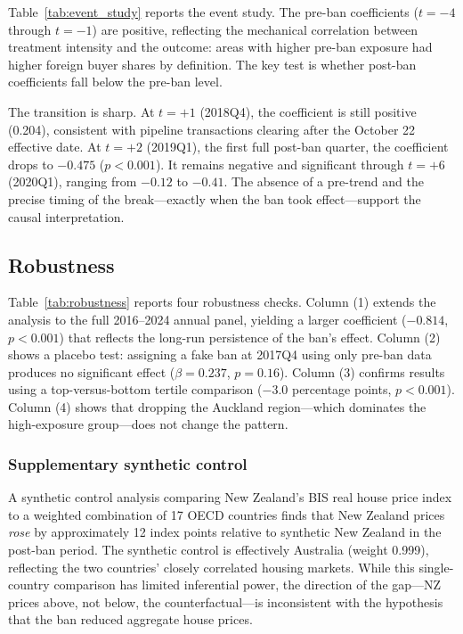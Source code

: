 \documentclass[12pt]{article}
\begin{document}
Table~\ref{tab:event_study} reports the event study. The pre-ban coefficients ($t = -4$ through $t = -1$) are positive, reflecting the mechanical correlation between treatment intensity and the outcome: areas with higher pre-ban exposure had higher foreign buyer shares by definition. The key test is whether post-ban coefficients fall below the pre-ban level.

The transition is sharp. At $t = +1$ (2018Q4), the coefficient is still positive (0.204), consistent with pipeline transactions clearing after the October 22 effective date. At $t = +2$ (2019Q1), the first full post-ban quarter, the coefficient drops to $-0.475$ ($p < 0.001$). It remains negative and significant through $t = +6$ (2020Q1), ranging from $-0.12$ to $-0.41$. The absence of a pre-trend and the precise timing of the break---exactly when the ban took effect---support the causal interpretation.

\subsection{Robustness}



Table~\ref{tab:robustness} reports four robustness checks. Column (1) extends the analysis to the full 2016--2024 annual panel, yielding a larger coefficient ($-0.814$, $p < 0.001$) that reflects the long-run persistence of the ban's effect. Column (2) shows a placebo test: assigning a fake ban at 2017Q4 using only pre-ban data produces no significant effect ($\beta = 0.237$, $p = 0.16$). Column (3) confirms results using a top-versus-bottom tertile comparison ($-3.0$ percentage points, $p < 0.001$). Column (4) shows that dropping the Auckland region---which dominates the high-exposure group---does not change the pattern.

\subsubsection*{Supplementary synthetic control} A synthetic control analysis comparing New Zealand's BIS real house price index to a weighted combination of 17 OECD countries finds that New Zealand prices \emph{rose} by approximately 12 index points relative to synthetic New Zealand in the post-ban period. The synthetic control is effectively Australia (weight 0.999), reflecting the two countries' closely correlated housing markets. While this single-country comparison has limited inferential power, the direction of the gap---NZ prices above, not below, the counterfactual---is inconsistent with the hypothesis that the ban reduced aggregate house prices.
\end{document}
